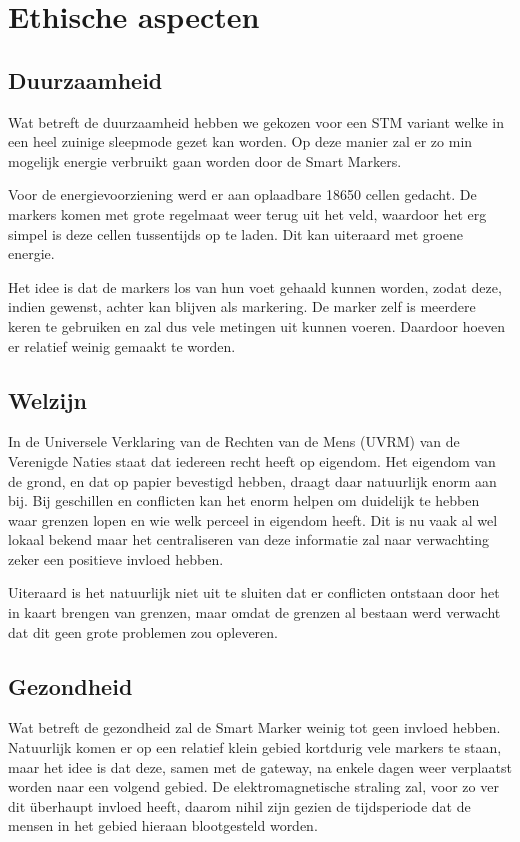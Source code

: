 \section{Ethische aspecten}
\subsection{Duurzaamheid}
Wat betreft de duurzaamheid hebben we gekozen voor een STM variant welke in een
heel zuinige sleepmode gezet kan worden. Op deze manier zal er zo min mogelijk
energie verbruikt gaan worden door de Smart Markers.

Voor de energievoorziening werd er aan oplaadbare 18650 cellen gedacht. De
markers komen met grote regelmaat weer terug uit het veld, waardoor het erg
simpel is deze cellen tussentijds op te laden. Dit kan uiteraard met groene
energie.

Het idee is dat de markers los van hun voet gehaald kunnen worden, zodat deze,
indien gewenst, achter kan blijven als markering. De marker zelf is meerdere
keren te gebruiken en zal dus vele metingen uit kunnen voeren. Daardoor hoeven
er relatief weinig gemaakt te worden.

\subsection{Welzijn}
In de Universele Verklaring van de Rechten van de Mens (UVRM) van de Verenigde
Naties staat dat iedereen recht heeft op eigendom. Het eigendom van de grond, en
dat op papier bevestigd hebben, draagt daar natuurlijk enorm aan bij.
Bij geschillen en conflicten kan het enorm helpen om duidelijk te hebben waar
grenzen lopen en wie welk perceel in eigendom heeft. Dit is nu vaak al wel
lokaal bekend maar het centraliseren van deze informatie zal naar verwachting
zeker een positieve invloed hebben.

Uiteraard is het natuurlijk niet uit te sluiten dat er conflicten ontstaan door
het in kaart brengen van grenzen, maar omdat de grenzen al bestaan werd verwacht
dat dit geen grote problemen zou opleveren.

\subsection{Gezondheid}
Wat betreft de gezondheid zal de Smart Marker weinig tot geen invloed hebben.
Natuurlijk komen er op een relatief klein gebied kortdurig vele markers te
staan, maar het idee is dat deze, samen met de gateway, na enkele dagen weer
verplaatst worden naar een volgend gebied. De elektromagnetische straling zal,
voor zo ver dit überhaupt invloed heeft, daarom nihil zijn gezien de
tijdsperiode dat de mensen in het gebied hieraan blootgesteld worden.
